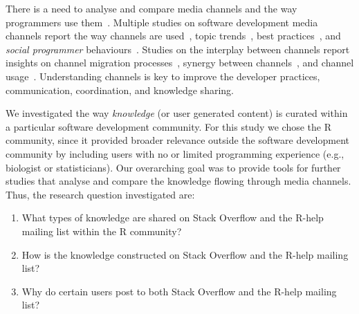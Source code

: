 \documentclass{sig-alternate-05-2015}
\begin{document}
There is a need to analyse and compare media channels and the way programmers use them~\cite{Vasilescu2014b}.
	Multiple studies on software development media channels report the way channels are used~\cite{Guzzi2013, Storey2014, Singer2014},  topic trends~\cite{Barua2012, Kavaler2013, Wang2013d}, best practices~\cite{Asaduzzaman2013, Treude2011, Allamanis2013}, and \textit{social programmer} behaviours~\cite{Lang2013}.
	Studies on the interplay between channels report insights on channel migration processes~\cite{Vasilescu2014c}, synergy between channels~\cite{Vasilescu2013a, Bird2006, Kavaler2013}, and channel usage~\cite{Stolee2010,Storey2014}.
Understanding channels is key to improve the developer practices, communication, coordination, and knowledge sharing.


	We investigated the way \textit{knowledge} (or user generated content) is curated within a particular software development community.
	For this study we chose the R community, since it provided broader relevance outside the software development community by including users with no or limited programming experience (e.g., biologist or statisticians).
	Our overarching goal was to provide tools for further studies that analyse and compare the knowledge flowing through media channels.
	Thus, the research question investigated are:

	\begin{enumerate}[\bfseries RQ-1.]
	  \setlength{\itemsep}{3pt}
      \setlength{\parskip}{0pt}
      \setlength{\parsep}{0pt}
		\item What types of knowledge are shared on Stack Overflow and the R-help mailing list within the R community?
		\item How is the knowledge constructed on Stack Overflow and the R-help mailing list? 
		\item Why do certain users post to both Stack Overflow and the R-help mailing list?
	\end{enumerate}
\end{document}
